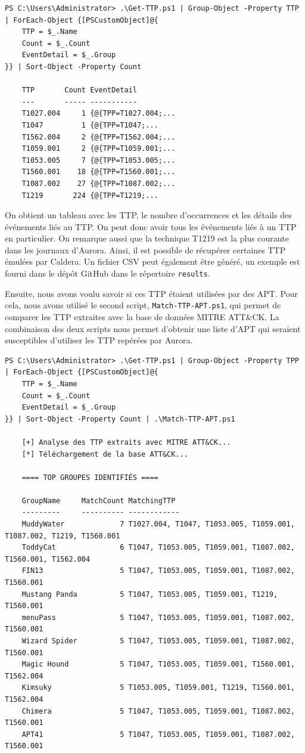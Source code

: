 \documentclass[12pt,letterpaper]{article}
\begin{document}
\begin{lstlisting}[caption={Recherche des TTP dans les journaux d'Aurora}, label={lst:ttp_logs}]
PS C:\Users\Administrator> .\Get-TTP.ps1 | Group-Object -Property TTP | ForEach-Object {[PSCustomObject]@{
    TTP = $_.Name
    Count = $_.Count
    EventDetail = $_.Group
}} | Sort-Object -Property Count

    TTP       Count EventDetail
    ---       ----- -----------
    T1027.004     1 {@{TPP=T1027.004;...
    T1047         1 {@{TPP=T1047;...
    T1562.004     2 {@{TPP=T1562.004;...
    T1059.001     2 {@{TPP=T1059.001;...
    T1053.005     7 {@{TPP=T1053.005;...
    T1560.001    18 {@{TPP=T1560.001;...
    T1087.002    27 {@{TPP=T1087.002;...
    T1219       224 {@{TPP=T1219;...
\end{lstlisting}

On obtient un tableau avec les TTP, le nombre d'occurrences et les détails des événements liés au TTP.
On peut donc avoir tous les événements liés à un TTP en particulier.
On remarque aussi que la technique T1219 est la plus courante dans les journaux d'Aurora.
Ainsi, il est possible de récupérer certaines TTP émulées par Caldera.
Un fichier CSV peut également être généré, un exemple est fourni dans le dépôt GitHub dans le répertoire \verb|results|.

\bigskip

Ensuite, nous avons voulu savoir si ces TTP étaient utilisées par des APT.
Pour cela, nous avons utilisé le second script, \verb|Match-TTP-APT.ps1|, qui permet de comparer les TTP extraites avec la base de données MITRE ATT\&CK.
La combinaison des deux scripts nous permet d'obtenir une liste d'APT qui seraient susceptibles d'utiliser les TTP repérées par Aurora.
\begin{lstlisting}[caption={Identification des APT}, label={lst:apt_logs}]
PS C:\Users\Administrator> .\Get-TTP.ps1 | Group-Object -Property TPP | ForEach-Object {[PSCustomObject]@{
    TTP = $_.Name
    Count = $_.Count
    EventDetail = $_.Group
}} | Sort-Object -Property Count | .\Match-TTP-APT.ps1

    [+] Analyse des TTP extraits avec MITRE ATT&CK...
    [*] Téléchargement de la base ATT&CK...

    ==== TOP GROUPES IDENTIFIÉS ====

    GroupName     MatchCount MatchingTTP
    ---------     ---------- ------------
    MuddyWater             7 T1027.004, T1047, T1053.005, T1059.001, T1087.002, T1219, T1560.001
    ToddyCat               6 T1047, T1053.005, T1059.001, T1087.002, T1560.001, T1562.004
    FIN13                  5 T1047, T1053.005, T1059.001, T1087.002, T1560.001
    Mustang Panda          5 T1047, T1053.005, T1059.001, T1219, T1560.001
    menuPass               5 T1047, T1053.005, T1059.001, T1087.002, T1560.001
    Wizard Spider          5 T1047, T1053.005, T1059.001, T1087.002, T1560.001
    Magic Hound            5 T1047, T1053.005, T1059.001, T1560.001, T1562.004
    Kimsuky                5 T1053.005, T1059.001, T1219, T1560.001, T1562.004
    Chimera                5 T1047, T1053.005, T1059.001, T1087.002, T1560.001
    APT41                  5 T1047, T1053.005, T1059.001, T1087.002, T1560.001
\end{lstlisting}
\end{document}
